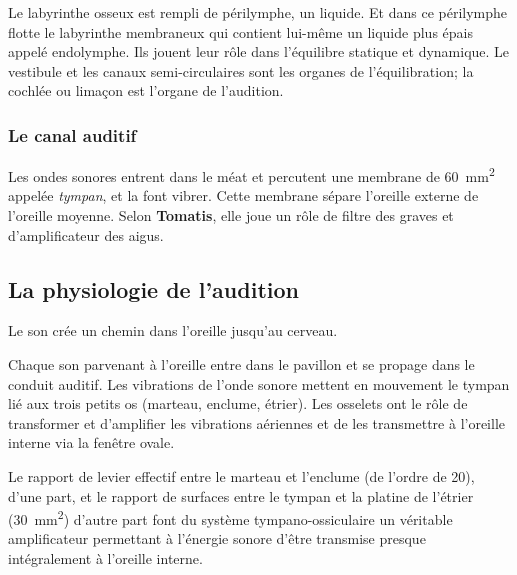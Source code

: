 Le labyrinthe
osseux est rempli de périlymphe, un liquide. Et dans ce périlymphe
flotte le labyrinthe membraneux qui contient lui-même un liquide
plus épais appelé endolymphe. Ils jouent leur rôle dans l'équilibre
statique et dynamique. Le vestibule et les canaux semi-circulaires
sont les organes de l'équilibration; la cochlée ou
limaçon est l'organe de l'audition. 

\subsubsection{Le canal auditif}
Les ondes sonores entrent dans le méat et percutent
une membrane de \SI{60}{\milli\metre\squared} appelée \emph{tympan}, et la font vibrer. Cette membrane
sépare l'oreille externe de l'oreille moyenne.
Selon \textbf{Tomatis}, elle
joue un rôle de filtre des graves et d'amplificateur des aigus.



\subsection{La physiologie de l'audition}

Le  son crée un chemin dans 
l'oreille\autocite[chap. 8, pp. 322--324]{marieb:biologie} jusqu'au cerveau.

Chaque son parvenant à l'oreille entre dans le pavillon et se propage
dans le conduit auditif. Les vibrations de l'onde sonore mettent en
mouvement le tympan lié aux trois petits os (marteau, enclume, étrier).
Les osselets ont le rôle de transformer et d'amplifier les vibrations
aériennes et de les transmettre à l'oreille interne via la fenêtre
ovale.

Le rapport de levier effectif entre le marteau et l'enclume
(de l'ordre de 20), d'une part, et le
rapport de surfaces entre le tympan et la platine de l'étrier
(\SI{30}{\milli\metre\squared}) d\textquoteright autre part font du système tympano-ossiculaire
un véritable amplificateur permettant à l\textquoteright énergie sonore
d\textquoteright être transmise presque intégralement à l\textquoteright oreille
interne.

